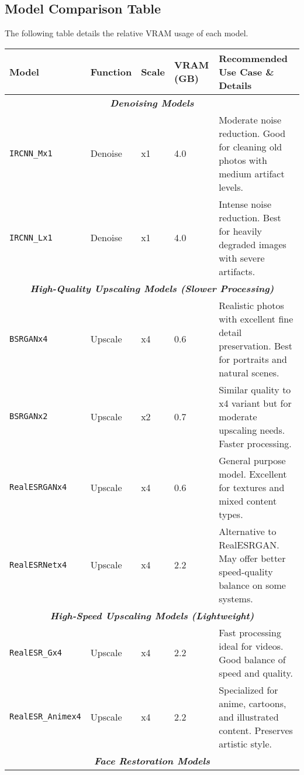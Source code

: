 \documentclass[11pt, a4paper]{article}
\begin{document}
\subsection{Model Comparison Table}
The following table details the relative VRAM usage of each model.
\begin{longtable}{p{2.8cm} p{1.8cm} p{1.2cm} p{1.5cm} p{7.2cm}}
\toprule
\textbf{Model} & \textbf{Function} & \textbf{Scale} & \textbf{VRAM (GB)} & \textbf{Recommended Use Case \& Details} \\
\midrule
\endhead %

\multicolumn{5}{c}{\textit{\textbf{Denoising Models}}} \\
\midrule
\texttt{IRCNN\_Mx1} & Denoise & x1 & 4.0 & Moderate noise reduction. Good for cleaning old photos with medium artifact levels. \\
\texttt{IRCNN\_Lx1} & Denoise & x1 & 4.0 & Intense noise reduction. Best for heavily degraded images with severe artifacts. \\
\midrule
\multicolumn{5}{c}{\textit{\textbf{High-Quality Upscaling Models (Slower Processing)}}} \\
\midrule
\texttt{BSRGANx4} & Upscale & x4 & 0.6 & Realistic photos with excellent fine detail preservation. Best for portraits and natural scenes. \\
\texttt{BSRGANx2} & Upscale & x2 & 0.7 & Similar quality to x4 variant but for moderate upscaling needs. Faster processing. \\
\texttt{RealESRGANx4} & Upscale & x4 & 0.6 & General purpose model. Excellent for textures and mixed content types. \\
\texttt{RealESRNetx4} & Upscale & x4 & 2.2 & Alternative to RealESRGAN. May offer better speed-quality balance on some systems. \\
\midrule
\multicolumn{5}{c}{\textit{\textbf{High-Speed Upscaling Models (Lightweight)}}} \\
\midrule
\texttt{RealESR\_Gx4} & Upscale & x4 & 2.2 & Fast processing ideal for videos. Good balance of speed and quality. \\
\texttt{RealESR\_Animex4} & Upscale & x4 & 2.2 & Specialized for anime, cartoons, and illustrated content. Preserves artistic style. \\
\midrule
\multicolumn{5}{c}{\textit{\textbf{Face Restoration Models}}} \\

\end{longtable}
\end{document}
